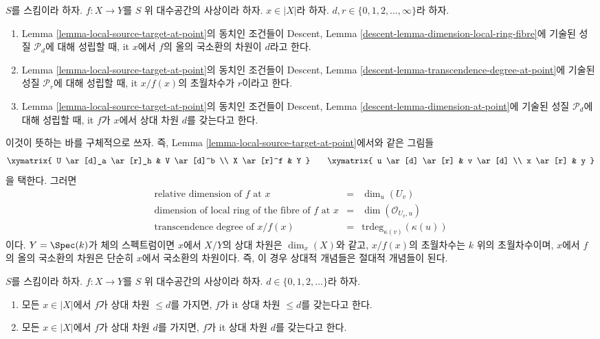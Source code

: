 \begin{definition}
\label{definition-dimension-fibre}
$S$를 스킴이라 하자.
$f : X \to Y$를 $S$ 위 대수공간의 사상이라 하자.
$x \in |X|$라 하자.
$d, r \in \{0, 1, 2, \ldots, \infty\}$라 하자.
\begin{enumerate}
\item Lemma \ref{lemma-local-source-target-at-point}의 동치인 조건들이
Descent, Lemma \ref{descent-lemma-dimension-local-ring-fibre}에 기술된
성질 $\mathcal{P}_d$에 대해 성립할 때,
{it $x$에서 $f$의 올의 국소환의 차원}이 $d$라고 한다.
\item Lemma \ref{lemma-local-source-target-at-point}의 동치인 조건들이
Descent, Lemma \ref{descent-lemma-transcendence-degree-at-point}에 기술된
성질 $\mathcal{P}_r$에 대해 성립할 때,
{it $x/f(x)$의 초월차수}가 $r$이라고 한다.
\item Lemma \ref{lemma-local-source-target-at-point}의 동치인 조건들이
Descent, Lemma \ref{descent-lemma-dimension-at-point}에 기술된
성질 $\mathcal{P}_d$에 대해 성립할 때,
{it $f$가 $x$에서 상대 차원 $d$를 갖는다}고 한다.
\end{enumerate}
\end{definition}

\noindent
이것이 뜻하는 바를 구체적으로 쓰자. 즉, Lemma
\ref{lemma-local-source-target-at-point}에서와 같은 그림들
$$
\xymatrix{
U \ar[d]_a \ar[r]_h & V \ar[d]^b \\
X \ar[r]^f & Y
}
\quad\quad
\xymatrix{
u \ar[d] \ar[r] & v \ar[d] \\
x \ar[r] & y
}
$$
을 택한다. 그러면
$$
\begin{matrix}
\text{relative dimension of }f\text{ at }x & = &
\dim_u (U_v) \\
\text{dimension of local ring of the fibre of }f\text{ at }x & = &
\dim(\mathcal{O}_{U_v, u})\\
\text{transcendence degree of }x/f(x) & = &
\text{trdeg}_{\kappa(v)}(\kappa(u))
\end{matrix}
$$
이다. $Y = \Spec(k)$가 체의 스펙트럼이면 $x$에서 $X/Y$의 상대
차원은 $\dim_x(X)$와 같고, $x/f(x)$의 초월차수는 $k$ 위의
초월차수이며, $x$에서 $f$의 올의 국소환의 차원은 단순히
$x$에서 국소환의 차원이다. 즉, 이 경우 상대적 개념들은 절대적
개념들이 된다.

\begin{definition}
\label{definition-relative-dimension}
$S$를 스킴이라 하자.
$f : X \to Y$를 $S$ 위 대수공간의 사상이라 하자.
$d \in \{0, 1, 2, \ldots\}$라 하자.
\begin{enumerate}
\item 모든 $x \in |X|$에서 $f$가 상대 차원 $\leq d$를 가지면,
$f$가 {it 상대 차원 $\leq d$}를 갖는다고 한다.
\item 모든 $x \in |X|$에서 $f$가 상대 차원 $d$를 가지면,
$f$가 {it 상대 차원 $d$}를 갖는다고 한다.
\end{enumerate}
\end{definition}

